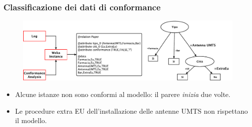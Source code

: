 
\begin{frame}
	\frametitle{Classificazione dei dati di conformance}
	\begin{figure}
	\includegraphics[scale=0.6]{./fig/decisiontree1}
	\end{figure}
	\begin{block}{}
	\begin{itemize}
	\item Alcune istanze non sono conformi al modello: il parere \textit{inizia} due volte.
	\item Le procedure extra EU dell'installazione delle antenne UMTS non rispettano il modello.
	\end{itemize}
	\end{block}
	\end{frame}
	
	